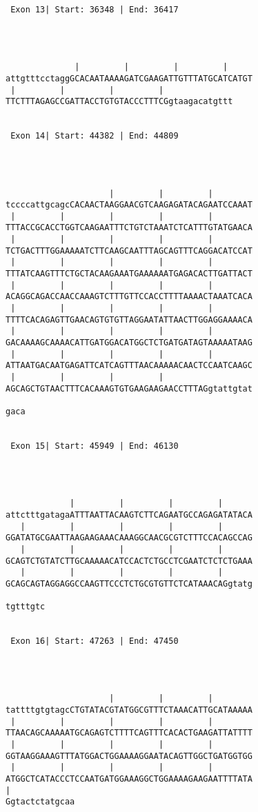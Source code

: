 \documentclass{article}
\begin{document}
\begin{Verbatim}
 Exon 13| Start: 36348 | End: 36417 




              |         |         |         |     
attgtttcctaggGCACAATAAAAGATCGAAGATTGTTTATGCATCATGT
 |         |         |         | 
TTCTTTAGAGCCGATTACCTGTGTACCCTTTCGgtaagacatgttt


 Exon 14| Start: 44382 | End: 44809 




                     |         |         |        
tccccattgcagcCACAACTAAGGAACGTCAAGAGATACAGAATCCAAAT
 |         |         |         |         |        
TTTACCGCACCTGGTCAAGAATTTCTGTCTAAATCTCATTTGTATGAACA
 |         |         |         |         |        
TCTGACTTTGGAAAAATCTTCAAGCAATTTAGCAGTTTCAGGACATCCAT
 |         |         |         |         |        
TTTATCAAGTTTCTGCTACAAGAAATGAAAAAATGAGACACTTGATTACT
 |         |         |         |         |        
ACAGGCAGACCAACCAAAGTCTTTGTTCCACCTTTTAAAACTAAATCACA
 |         |         |         |         |        
TTTTCACAGAGTTGAACAGTGTGTTAGGAATATTAACTTGGAGGAAAACA
 |         |         |         |         |        
GACAAAAGCAAAACATTGATGGACATGGCTCTGATGATAGTAAAAATAAG
 |         |         |         |         |        
ATTAATGACAATGAGATTCATCAGTTTAACAAAAACAACTCCAATCAAGC
 |         |         |         |                  
AGCAGCTGTAACTTTCACAAAGTGTGAAGAAGAACCTTTAGgtattgtat

gaca


 Exon 15| Start: 45949 | End: 46130 




             |         |         |         |      
attctttgatagaATTTAATTACAAGTCTTCAGAATGCCAGAGATATACA
   |         |         |         |         |      
GGATATGCGAATTAAGAAGAAACAAAGGCAACGCGTCTTTCCACAGCCAG
   |         |         |         |         |      
GCAGTCTGTATCTTGCAAAAACATCCACTCTGCCTCGAATCTCTCTGAAA
   |         |         |         |         |      
GCAGCAGTAGGAGGCCAAGTTCCCTCTGCGTGTTCTCATAAACAGgtatg

tgtttgtc


 Exon 16| Start: 47263 | End: 47450 




                     |         |         |        
tattttgtgtagcCTGTATACGTATGGCGTTTCTAAACATTGCATAAAAA
 |         |         |         |         |        
TTAACAGCAAAAATGCAGAGTCTTTTCAGTTTCACACTGAAGATTATTTT
 |         |         |         |         |        
GGTAAGGAAAGTTTATGGACTGGAAAAGGAATACAGTTGGCTGATGGTGG
 |         |         |         |         |        
ATGGCTCATACCCTCCAATGATGGAAAGGCTGGAAAAGAAGAATTTTATA
|
Ggtactctatgcaa



\end{Verbatim}
\end{document}
